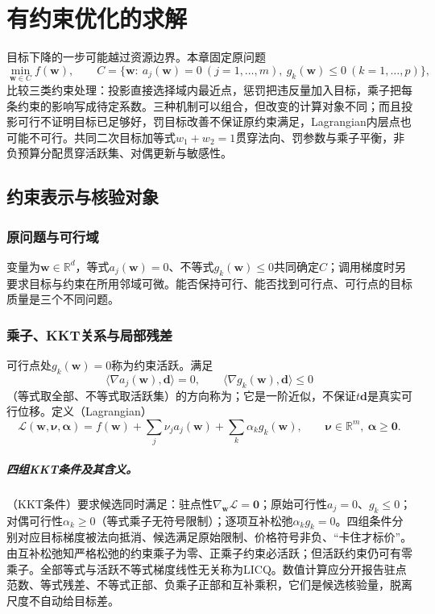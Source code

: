 \chapter{有约束优化的求解}
\label{chap:constrained-optimization}

目标下降的一步可能越过资源边界。本章固定原问题
\[
 \min_{\bm w\in C}f(\bm w),\qquad
 C=\{\bm w:\ a_j(\bm w)=0\ (j=1,\ldots,m),\ g_k(\bm w)\leq0\ (k=1,\ldots,p)\},
\]
比较三类约束处理：投影直接选择域内最近点，惩罚把违反量加入目标，乘子把每条约束的影响写成待定系数。三种机制可以组合，但改变的计算对象不同；而且投影可行不证明目标已足够好，罚目标改善不保证原约束满足，Lagrangian内层点也可能不可行。共同二次目标加等式$w_1+w_2=1$贯穿法向、罚参数与乘子平衡，非负预算分配贯穿活跃集、对偶更新与敏感性。

\section{约束表示与核验对象}

\subsection{原问题与可行域}

变量为$\bm w\in\mathbb R^d$，等式$a_j(\bm w)=0$、不等式$g_k(\bm w)\leq0$共同确定$C$；调用梯度时另要求目标与约束在所用邻域可微。能否保持可行、能否找到可行点、可行点的目标质量是三个不同问题。

\subsection{乘子、KKT关系与局部残差}

可行点处$g_k(\bm w)=0$称为约束活跃。满足
\[
 \langle\nabla a_j(\bm w),\bm d\rangle=0,\qquad
 \langle\nabla g_k(\bm w),\bm d\rangle\leq0
\]
（等式取全部、不等式取活跃集）的方向称为；它是一阶近似，不保证$t\bm d$是真实可行位移。定义（Lagrangian）
\begin{equation}
 \mathcal L(\bm w,\bm\nu,\bm\alpha)
 =f(\bm w)+\sum_j\nu_j a_j(\bm w)+\sum_k\alpha_k g_k(\bm w),
 \qquad
 \bm\nu\in\mathbb R^m,\ \bm\alpha\geq\bm0.
 \label{eq:opt-lagrangian}
\end{equation}

\paragraph{四组KKT条件及其含义。}
（KKT条件）要求候选同时满足：驻点性$\nabla_{\bm w}\mathcal L=\bm0$；原始可行性$a_j=0$、$g_k\leq0$；对偶可行性$\alpha_k\geq0$（等式乘子无符号限制）；逐项互补松弛$\alpha_k g_k=0$。四组条件分别对应目标梯度被法向抵消、候选满足原始限制、价格符号非负、“卡住才标价”。由互补松弛知严格松弛的约束乘子为零、正乘子约束必活跃；但活跃约束仍可有零乘子。全部等式与活跃不等式梯度线性无关称为LICQ。数值计算应分开报告驻点范数、等式残差、不等式正部、负乘子正部和互补乘积，它们是候选核验量，脱离尺度不自动给目标差。

